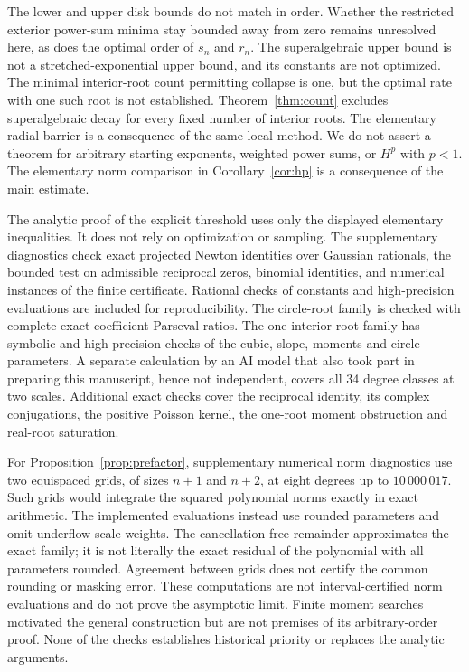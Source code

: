 \documentclass[11pt]{article}
\theoremstyle{remark}\newtheorem{remark}[theorem]{Remark}
\begin{document}
The lower and upper disk bounds do not match in order.
Whether the restricted exterior power-sum minima stay bounded
away from zero remains unresolved here, as does the optimal order
of \(s_n\) and \(r_n\).
The superalgebraic upper bound is not a stretched-exponential upper
bound, and its constants are not optimized. The minimal interior-root
count permitting collapse is one, but the optimal rate with one such
root is not established. Theorem~\ref{thm:count} excludes
superalgebraic decay for every fixed number of interior roots. The elementary radial
barrier is a consequence of the same local method.
We do not assert a theorem for arbitrary starting exponents,
weighted power sums, or \(H^p\) with \(p<1\).
The elementary norm comparison in Corollary~\ref{cor:hp} is a
consequence of the main estimate.

The analytic proof of the explicit threshold uses only the displayed
elementary inequalities. It does not rely on optimization or sampling.
The supplementary diagnostics check exact projected Newton identities
over Gaussian rationals, the bounded test on admissible reciprocal
zeros, binomial identities, and numerical instances of the finite
certificate. Rational checks of constants and high-precision
evaluations are included for reproducibility. The circle-root family
is checked with complete exact coefficient Parseval ratios.
The one-interior-root family has symbolic and high-precision checks
of the cubic, slope, moments and circle parameters.
A separate calculation by an AI model that also took part in preparing
this manuscript, hence not independent, covers
all 34 degree classes at two scales.
Additional exact checks cover the reciprocal identity, its complex
conjugations, the positive Poisson kernel, the one-root moment
obstruction and real-root saturation.

For Proposition~\ref{prop:prefactor}, supplementary numerical norm
diagnostics use two equispaced grids, of sizes \(n+1\) and \(n+2\),
at eight degrees up to \(10\,000\,017\). Such grids would integrate
the squared polynomial norms exactly in exact arithmetic. The
implemented evaluations instead use rounded parameters and omit
underflow-scale weights. The cancellation-free remainder approximates
the exact family; it is not literally the exact residual of the
polynomial with all parameters rounded. Agreement between grids
does not certify the common rounding or masking error.
These computations are not interval-certified norm evaluations and
do not prove the asymptotic limit. Finite moment searches motivated
the general construction but are not premises of its arbitrary-order
proof. None of the checks establishes historical priority or replaces
the analytic arguments.
\end{document}
